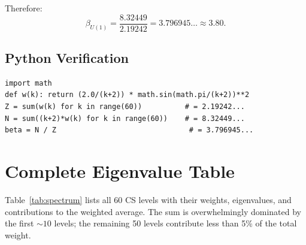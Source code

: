 \documentclass[12pt,a4paper]{article}
\begin{document}
Therefore:
\begin{equation}
\boxed{
\beta_{U(1)} = \frac{8.32449}{2.19242} = 3.796945\ldots \approx 3.80.
}
\end{equation}

\subsection{Python Verification}

\begin{verbatim}
import math
def w(k): return (2.0/(k+2)) * math.sin(math.pi/(k+2))**2
Z = sum(w(k) for k in range(60))          # = 2.19242...
N = sum((k+2)*w(k) for k in range(60))    # = 8.32449...
beta = N / Z                               # = 3.796945...
\end{verbatim}

\section{Complete Eigenvalue Table}
\label{sec:table}

Table~\ref{tab:spectrum} lists all 60 CS levels with their weights,
eigenvalues, and contributions to the weighted average.  The sum is
overwhelmingly dominated by the first $\sim 10$ levels; the remaining
50 levels contribute less than 5\% of the total weight.
\end{document}
